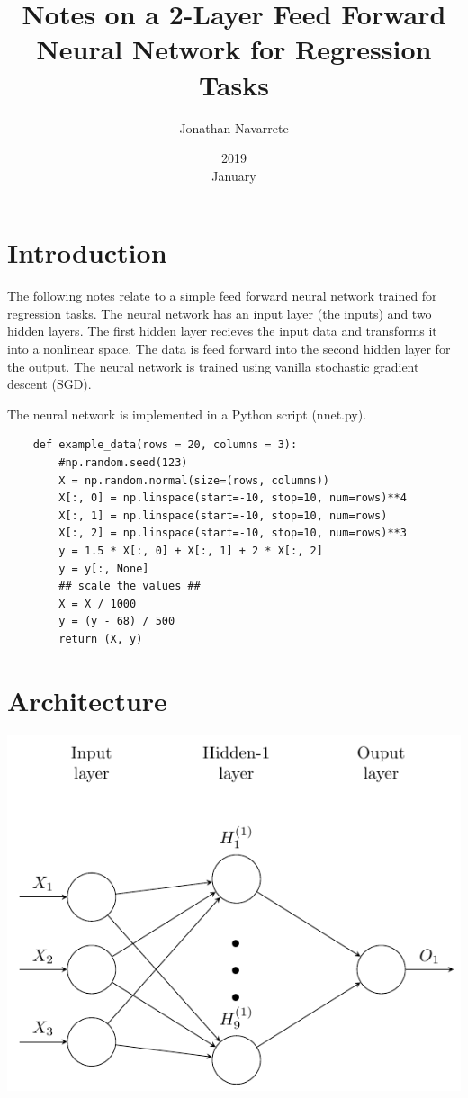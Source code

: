 \documentclass[12pt]{article}%
\title{Notes on a 2-Layer Feed Forward Neural Network for Regression Tasks}
\date{2019\\ January}
\author{Jonathan Navarrete}
\begin{document}
\maketitle

\section{Introduction}
	The following notes relate to a simple feed forward neural network trained for regression tasks. The neural network has an input layer (the inputs) and two hidden layers. The first hidden layer recieves the input data and transforms it into a nonlinear space. The data is feed forward into the second hidden layer for the output. The neural network is trained using vanilla stochastic gradient descent (SGD).
	
	The neural network is implemented in a Python script (nnet.py).


\lstset{language=Python}
\lstset{basicstyle=\small\sffamily}
\begin{lstlisting}
    def example_data(rows = 20, columns = 3):
        #np.random.seed(123)
        X = np.random.normal(size=(rows, columns))
        X[:, 0] = np.linspace(start=-10, stop=10, num=rows)**4
        X[:, 1] = np.linspace(start=-10, stop=10, num=rows)
        X[:, 2] = np.linspace(start=-10, stop=10, num=rows)**3
        y = 1.5 * X[:, 0] + X[:, 1] + 2 * X[:, 2]
        y = y[:, None]
        ## scale the values ##
        X = X / 1000
        y = (y - 68) / 500
        return (X, y)
\end{lstlisting}






\section{Architecture}

\includegraphics{nnet.pdf}
\end{document}
